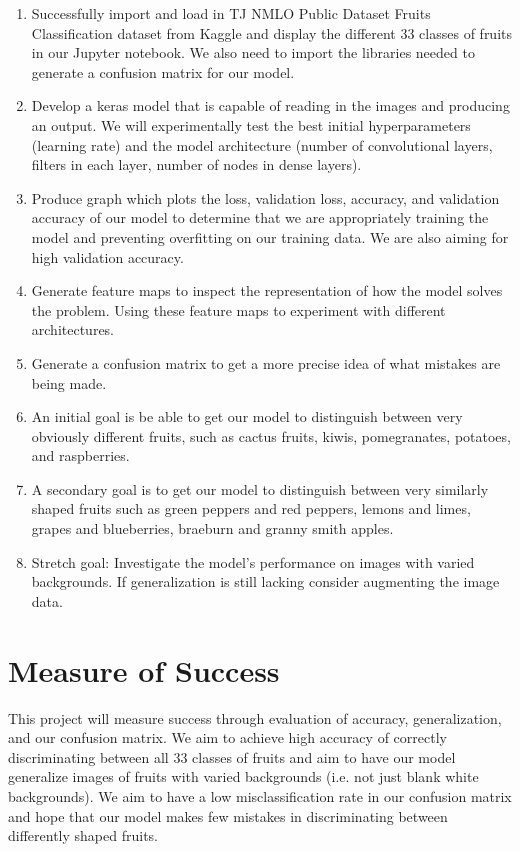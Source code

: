 \documentclass[11pt]{article}
\begin{document}
\begin{enumerate}
    \item Successfully import and load in TJ NMLO Public Dataset Fruits Classification dataset from Kaggle and display the different 33 classes of fruits in our Jupyter notebook. We also need to import the libraries needed to generate a confusion matrix for our model.
    \item Develop a keras model that is capable of reading in the images and producing an output. We will experimentally test the best initial hyperparameters (learning rate) and the model architecture (number of convolutional layers, filters in each layer, number of nodes in dense layers). 
    \item Produce graph which plots the loss, validation loss, accuracy, and validation accuracy of our model to determine that we are appropriately training the model and preventing overfitting on our training data. We are also aiming for high validation accuracy.
    \item Generate feature maps to inspect the representation of how the model solves the problem. Using these feature maps to experiment with different architectures. 
    \item Generate a confusion matrix to get a more precise idea of what mistakes are being made.
    \item An initial goal is be able to get our model to distinguish between very obviously different fruits, such as cactus fruits, kiwis, pomegranates, potatoes, and raspberries. 
    \item A secondary goal is to get our model to distinguish between very similarly shaped fruits such as green peppers and red peppers, lemons and limes, grapes and blueberries, braeburn and granny smith apples.  
    \item Stretch goal: Investigate the model's performance on images with varied backgrounds. If generalization is still lacking consider augmenting the image data.
\end{enumerate} 

\section{Measure of Success}

This project will measure success through evaluation of accuracy, generalization, and our confusion matrix. We aim to achieve high accuracy of correctly discriminating between all 33 classes of fruits and aim to have our model generalize images of fruits with varied backgrounds (i.e. not just blank white backgrounds). We aim to have a low misclassification rate in our confusion matrix and hope that our model makes few mistakes in discriminating between differently shaped fruits. 
\end{document}
